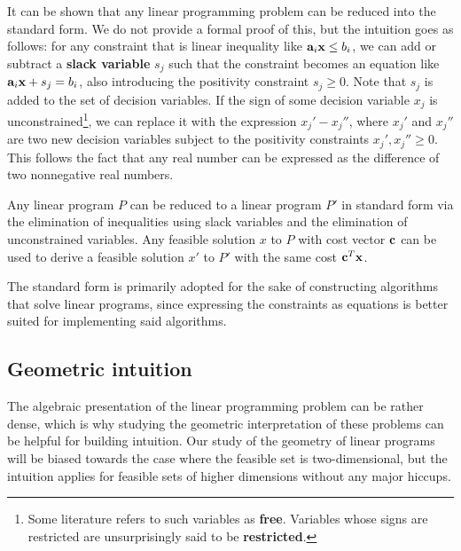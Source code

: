 \documentclass{paper}
\newenvironment{theorem}[2][Theorem]{\begin{trivlist}
\item[\hskip \labelsep {\bfseries #1}\hskip \labelsep {\bfseries #2.}]}{\end{trivlist}}
\newenvironment{gbox}{\begin{tcolorbox}[breakable,colback=green!20!white,colframe=green!10!black]}{\end{tcolorbox}}
\begin{document}
\bigskip
It can be shown that any linear programming problem can be reduced into the standard form. We do not provide a formal proof of this, but the intuition goes as follows: for any constraint that is linear inequality like $\bold{a}_i\bold{x} \leq b_i$, we can add or subtract a \textbf{slack variable} $s_j$ such that the constraint becomes an equation like $\bold{a}_i\bold{x} + s_j = b_i$, also introducing the positivity constraint $s_j \geq 0$. Note that $s_j$ is added to the set of decision variables. If the sign of some decision variable $x_j$ is unconstrained\footnote{Some literature refers to such variables as \textbf{free}. Variables whose signs are restricted are unsurprisingly said to be \textbf{restricted}.}, we can replace it with the expression $x_j' - x_j''$, where $x_j'$ and $x_j''$ are two new decision variables subject to the positivity constraints $x_j', x_j'' \geq 0$. This follows the fact that any real number can be expressed as the difference of two nonnegative real numbers.

\bigskip
\begin{gbox}
    \begin{theorem}{(Standard form reduction)}
        Any linear program $P$ can be reduced to a linear program $P'$ in standard form via the elimination of inequalities using slack variables and the elimination of unconstrained variables. Any feasible solution $x$ to $P$ with cost vector $\bold{c}$ can be used to derive a feasible solution $x'$ to $P'$ with the same cost $\bold{c}^T\bold{x}$.
    \end{theorem}
\end{gbox}

\bigskip
The standard form is primarily adopted for the sake of constructing algorithms that solve linear programs, since expressing the constraints as equations is better suited for implementing said algorithms.

\subsection{Geometric intuition}

The algebraic presentation of the linear programming problem can be rather dense, which is why studying the geometric interpretation of these problems can be helpful for building intuition. Our study of the geometry of linear programs will be biased towards the case where the feasible set is two-dimensional, but the intuition applies for feasible sets of higher dimensions without any major hiccups.
\end{document}
